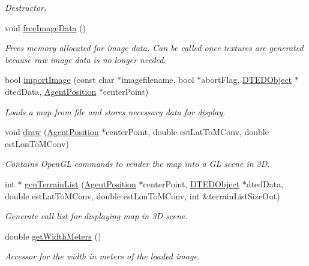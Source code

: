\begin{DoxyCompactItemize}
\begin{DoxyCompactList}\small\item\em Destructor. \end{DoxyCompactList}\item 
void \hyperlink{class_geomap3_d_a442d0efaa5a67ad6f6a4784bf60d73a0}{freeImageData} ()
\begin{DoxyCompactList}\small\item\em Frees memory allocated for image data. Can be called once textures are generated because raw image data is no longer needed. \end{DoxyCompactList}\item 
bool \hyperlink{class_geomap3_d_a80b950493b60caec36800391c3379da8}{importImage} (const char $\ast$imagefilename, bool $\ast$abortFlag, \hyperlink{class_d_t_e_d_object}{DTEDObject} $\ast$dtedData, \hyperlink{class_agent_position}{AgentPosition} $\ast$centerPoint)
\begin{DoxyCompactList}\small\item\em Loads a map from file and stores necessary data for display. \end{DoxyCompactList}\item 
void \hyperlink{class_geomap3_d_a69362ad464cf11185924680da764b2d6}{draw} (\hyperlink{class_agent_position}{AgentPosition} $\ast$centerPoint, double estLatToMConv, double estLonToMConv)
\begin{DoxyCompactList}\small\item\em Contains OpenGL commands to render the map into a GL scene in 3D. \end{DoxyCompactList}\item 
int $\ast$ \hyperlink{class_geomap3_d_a31508017c9648a8d45744a4624264cbe}{genTerrainList} (\hyperlink{class_agent_position}{AgentPosition} $\ast$centerPoint, \hyperlink{class_d_t_e_d_object}{DTEDObject} $\ast$dtedData, double estLatToMConv, double estLonToMConv, int \&terrainListSizeOut)
\begin{DoxyCompactList}\small\item\em Generate call list for displaying map in 3D scene. \end{DoxyCompactList}\item 
double \hyperlink{class_geomap3_d_adeb26ae3312817dc24a62517abc7eeea}{getWidthMeters} ()
\begin{DoxyCompactList}\small\item\em Accessor for the width in meters of the loaded image. \end{DoxyCompactList}\item 

\end{DoxyCompactItemize}
